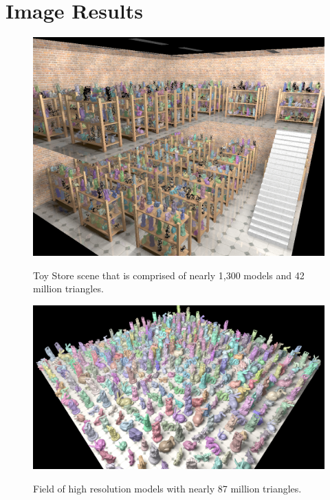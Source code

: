\documentclass[12pt]{ucthesis}
\newcommand{\captionfonts}{\small\bf\ssp}
\begin{document}
\clearpage



\section*{Image Results}

\begin{figure}[h!]
    \centering
    \includegraphics[width=140mm]{showoff/toystore.png}
    \captionfonts
    \caption{Toy Store scene that is comprised of nearly 1,300 models and 42 million triangles.}
    \label{fig:sotoystore}
\end{figure}

\begin{figure}[h!]
    \centering
    \includegraphics[width=140mm]{showoff/field.png}
    \captionfonts
    \caption{Field of high resolution models with nearly 87 million triangles.}
    \label{fig:sofield}
\end{figure}
\end{document}
